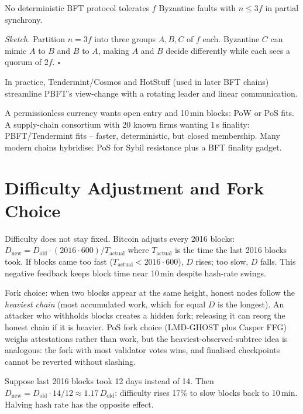\begin{theorem}\label{thm:bft-bound}
No deterministic BFT protocol tolerates $f$ Byzantine faults with $n\le 3f$ in partial synchrony.
\end{theorem}
\emph{Sketch.} Partition $n=3f$ into three groups $A,B,C$ of $f$ each. Byzantine $C$ can mimic $A$ to $B$ and $B$ to $A$, making $A$ and $B$ decide differently while each sees a quorum of $2f$. \hfill$\square$

In practice, Tendermint/Cosmos and HotStuff (used in later BFT chains) streamline PBFT's view-change with a rotating leader and linear communication.

\begin{example}\label{ex:choose}
A permissionless currency wants open entry and 10\,min blocks: PoW or PoS fits. A supply-chain consortium with 20 known firms wanting 1\,s finality: PBFT/Tendermint fits -- faster, deterministic, but closed membership. Many modern chains hybridise: PoS for Sybil resistance plus a BFT finality gadget.
\end{example}

\section{Difficulty Adjustment and Fork Choice}\label{sec:fork-choice}
Difficulty does not stay fixed. Bitcoin adjusts every 2016 blocks: $D_{\text{new}}=D_{\text{old}}\cdot (2016\cdot600)/T_{\text{actual}}$ where $T_{\text{actual}}$ is the time the last 2016 blocks took. If blocks came too fast ($T_{\text{actual}}<2016\cdot600$), $D$ rises; too slow, $D$ falls. This negative feedback keeps block time near 10\,min despite hash-rate swings.

Fork choice: when two blocks appear at the same height, honest nodes follow the \emph{heaviest chain} (most accumulated work, which for equal $D$ is the longest). An attacker who withholds blocks creates a hidden fork; releasing it can reorg the honest chain if it is heavier. PoS fork choice (LMD-GHOST plus Casper FFG) weighs attestations rather than work, but the heaviest-observed-subtree idea is analogous: the fork with most validator votes wins, and finalised checkpoints cannot be reverted without slashing.

\begin{example}\label{ex:retarget}
Suppose last 2016 blocks took 12 days instead of 14. Then $D_{\text{new}}=D_{\text{old}}\cdot 14/12\approx1.17\,D_{\text{old}}$: difficulty rises 17\% to slow blocks back to 10\,min. Halving hash rate has the opposite effect.
\end{example}

